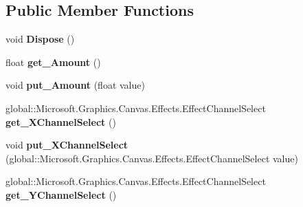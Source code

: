 \subsection*{Public Member Functions}
\begin{DoxyCompactItemize}
\item 
\mbox{\label{class_microsoft_1_1_graphics_1_1_canvas_1_1_effects_1_1_displacement_map_effect_a3bc67d76982886e7a8944528ef1e212c}} 
void {\bfseries Dispose} ()
\item 
\mbox{\label{class_microsoft_1_1_graphics_1_1_canvas_1_1_effects_1_1_displacement_map_effect_ab9cf484fc72d3724bf8b3090cfadbdc0}} 
float {\bfseries get\+\_\+\+Amount} ()
\item 
\mbox{\label{class_microsoft_1_1_graphics_1_1_canvas_1_1_effects_1_1_displacement_map_effect_a778035a283ef8ab94cb70d3718c04523}} 
void {\bfseries put\+\_\+\+Amount} (float value)
\item 
\mbox{\label{class_microsoft_1_1_graphics_1_1_canvas_1_1_effects_1_1_displacement_map_effect_a9de6395612f22b140d32e3ca061cd2a5}} 
global\+::\+Microsoft.\+Graphics.\+Canvas.\+Effects.\+Effect\+Channel\+Select {\bfseries get\+\_\+\+X\+Channel\+Select} ()
\item 
\mbox{\label{class_microsoft_1_1_graphics_1_1_canvas_1_1_effects_1_1_displacement_map_effect_a17232b9afecc3a3387aba9aa88381baf}} 
void {\bfseries put\+\_\+\+X\+Channel\+Select} (global\+::\+Microsoft.\+Graphics.\+Canvas.\+Effects.\+Effect\+Channel\+Select value)
\item 
\mbox{\label{class_microsoft_1_1_graphics_1_1_canvas_1_1_effects_1_1_displacement_map_effect_a054ea7ca343451632990c0ba5745cb36}} 
global\+::\+Microsoft.\+Graphics.\+Canvas.\+Effects.\+Effect\+Channel\+Select {\bfseries get\+\_\+\+Y\+Channel\+Select} ()
\item 

\end{DoxyCompactItemize}
